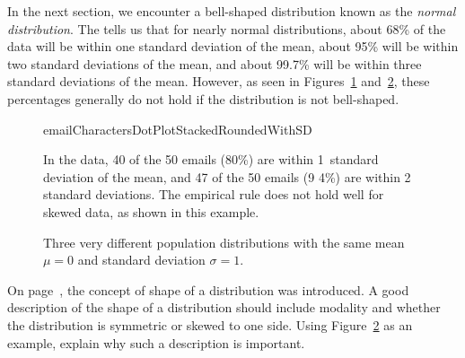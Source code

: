 In the next section, we encounter a bell-shaped distribution known as the \emph{normal distribution}.  The  tells us that for nearly normal distributions, about 68\% of the data will be within one standard deviation of the mean, about 95\% will be within two standard deviations of the mean, and about 99.7\% will be within three standard deviations of the mean. However, as seen in Figures~\ref{emailCharactersDotPlotStackedRoundedWithSD} and~\ref{severalDiffDistWithSdOf1}, these percentages generally do not hold if the distribution is not bell-shaped.  

\begin{figure}[h]
\centering
{}
    {emailCharactersDotPlotStackedRoundedWithSD}
\caption{In the  data, 40 of the 50 emails (80\%) are within 1~standard deviation of the mean, and 47 of the 50 emails (9
4\%) are within 2 standard deviations. The empirical rule does not hold well for skewed data, as shown in this example.}
\label{emailCharactersDotPlotStackedRoundedWithSD}
\end{figure}

\begin{figure}
\centering
{}
\caption{Three very different population distributions with the same mean $\mu=0$ and standard deviation $\sigma=1$.}
\label{severalDiffDistWithSdOf1}
\end{figure}

\begin{exercisewrap}
\begin{nexercise}
On page~\pageref{shapeFirstDiscussed}, the concept of shape of a distribution was introduced. A good description of the shape of a distribution should include modality and whether the distribution is symmetric or skewed to one side. Using Figure~\ref{severalDiffDistWithSdOf1} as an example, explain why such a description is important.\footnotemark
\end{nexercise}
\end{exercisewrap}





